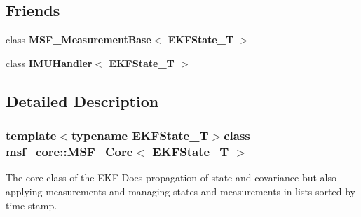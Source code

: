 \subsection*{Friends}
\begin{DoxyCompactItemize}
\item 
\hypertarget{classmsf__core_1_1MSF__Core_a096bb61133872bdd266587ce54e931e6}{class {\bfseries M\-S\-F\-\_\-\-Measurement\-Base$<$ E\-K\-F\-State\-\_\-\-T $>$}}\label{classmsf__core_1_1MSF__Core_a096bb61133872bdd266587ce54e931e6}

\item 
\hypertarget{classmsf__core_1_1MSF__Core_a868b4fae6ec6ad5b5ae95d1980ac1704}{class {\bfseries I\-M\-U\-Handler$<$ E\-K\-F\-State\-\_\-\-T $>$}}\label{classmsf__core_1_1MSF__Core_a868b4fae6ec6ad5b5ae95d1980ac1704}

\end{DoxyCompactItemize}


\subsection{Detailed Description}
\subsubsection*{template$<$typename E\-K\-F\-State\-\_\-\-T$>$class msf\-\_\-core\-::\-M\-S\-F\-\_\-\-Core$<$ E\-K\-F\-State\-\_\-\-T $>$}

The core class of the E\-K\-F Does propagation of state and covariance but also applying measurements and managing states and measurements in lists sorted by time stamp. 

